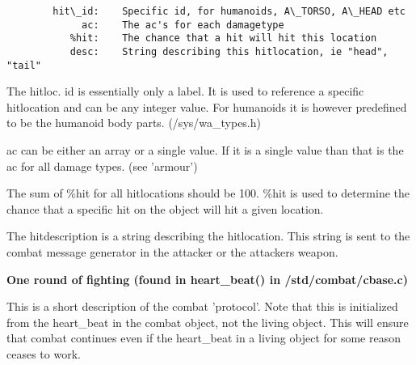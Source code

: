 \begin{verbatim}
        hit\_id:    Specific id, for humanoids, A\_TORSO, A\_HEAD etc
             ac:    The ac's for each damagetype
           %hit:    The chance that a hit will hit this location
           desc:    String describing this hitlocation, ie "head", "tail"
\end{verbatim} 

     The hitloc. id is essentially only a label. It is used to reference
     a specific hitlocation and can be any integer value. For humanoids it
     is however predefined to be the humanoid body parts. (/sys/wa\_types.h)

     ac can be either an array or a single value. If it is a single value
     than that is the ac for all damage types. (see 'armour')

     The sum of \%hit for all hitlocations should be 100. \%hit is used
     to determine the chance that a specific hit on the object will hit
     a given location. 

     The hitdescription is a string describing the hitlocation. This
     string is sent to the combat message generator in the attacker or
     the attackers weapon.

{\bf One round of fighting  (found in heart\_beat() in /std/combat/cbase.c)}


This is a short description of the combat 'protocol'. Note that this is 
initialized from the heart\_beat in the combat object, not the living object.
This will ensure that combat continues even if the heart\_beat in a living
object for some reason ceases to work.

